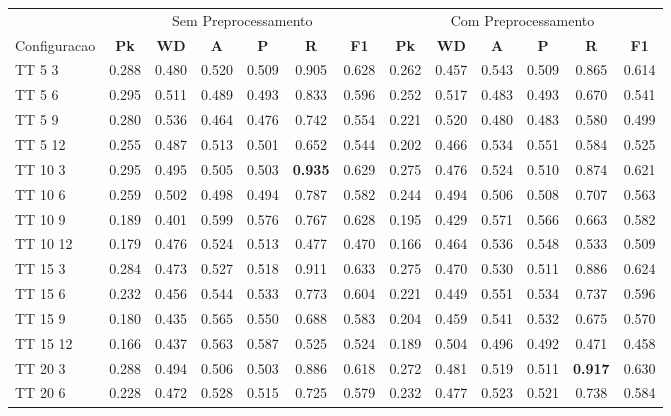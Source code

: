 \documentclass{article}
\begin{document}
 
\begin{tabular}{|l|c|c|c|c|c|c||c|c|c|c|c|c|} 
\hline
&\multicolumn{6}{c||}{Sem Preprocessamento} & \multicolumn{6}{c|}{Com Preprocessamento}\\ 
Configuracao & \textbf{Pk} & \textbf{WD} & \textbf{A } & \textbf{P } & \textbf{R } & \textbf{F1} & \textbf{Pk} & \textbf{WD} & \textbf{A } & \textbf{P } & \textbf{R } & \textbf{F1}\\ \hline
TT  5  3 & 0.288 & 0.480 & 0.520 & 0.509 & 0.905 & 0.628 & 0.262 & 0.457 & 0.543 & 0.509 & 0.865 & 0.614\\ \hline
TT  5  6 & 0.295 & 0.511 & 0.489 & 0.493 & 0.833 & 0.596 & 0.252 & 0.517 & 0.483 & 0.493 & 0.670 & 0.541\\ \hline
TT  5  9 & 0.280 & 0.536 & 0.464 & 0.476 & 0.742 & 0.554 & 0.221 & 0.520 & 0.480 & 0.483 & 0.580 & 0.499\\ \hline
TT  5 12 & 0.255 & 0.487 & 0.513 & 0.501 & 0.652 & 0.544 & 0.202 & 0.466 & 0.534 & 0.551 & 0.584 & 0.525\\ \hline
TT 10  3 & 0.295 & 0.495 & 0.505 & 0.503 & \textbf{0.935} & 0.629 & 0.275 & 0.476 & 0.524 & 0.510 & 0.874 & 0.621\\ \hline
TT 10  6 & 0.259 & 0.502 & 0.498 & 0.494 & 0.787 & 0.582 & 0.244 & 0.494 & 0.506 & 0.508 & 0.707 & 0.563\\ \hline
TT 10  9 & 0.189 & 0.401 & 0.599 & 0.576 & 0.767 & 0.628 & 0.195 & 0.429 & 0.571 & 0.566 & 0.663 & 0.582\\ \hline
TT 10 12 & 0.179 & 0.476 & 0.524 & 0.513 & 0.477 & 0.470 & 0.166 & 0.464 & 0.536 & 0.548 & 0.533 & 0.509\\ \hline
TT 15  3 & 0.284 & 0.473 & 0.527 & 0.518 & 0.911 & 0.633 & 0.275 & 0.470 & 0.530 & 0.511 & 0.886 & 0.624\\ \hline
TT 15  6 & 0.232 & 0.456 & 0.544 & 0.533 & 0.773 & 0.604 & 0.221 & 0.449 & 0.551 & 0.534 & 0.737 & 0.596\\ \hline
TT 15  9 & 0.180 & 0.435 & 0.565 & 0.550 & 0.688 & 0.583 & 0.204 & 0.459 & 0.541 & 0.532 & 0.675 & 0.570\\ \hline
TT 15 12 & 0.166 & 0.437 & 0.563 & 0.587 & 0.525 & 0.524 & 0.189 & 0.504 & 0.496 & 0.492 & 0.471 & 0.458\\ \hline
TT 20  3 & 0.288 & 0.494 & 0.506 & 0.503 & 0.886 & 0.618 & 0.272 & 0.481 & 0.519 & 0.511 & \textbf{0.917} & 0.630\\ \hline
TT 20  6 & 0.228 & 0.472 & 0.528 & 0.515 & 0.725 & 0.579 & 0.232 & 0.477 & 0.523 & 0.521 & 0.738 & 0.584\\ \hline

\end{tabular}
\end{document}
